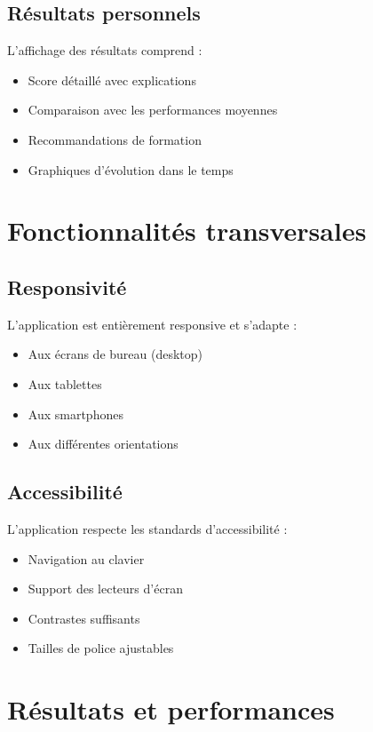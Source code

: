 \documentclass[12pt,a4paper]{report}
\begin{document}
\subsection{Résultats personnels}

L'affichage des résultats comprend :

\begin{itemize}
    \item Score détaillé avec explications
    \item Comparaison avec les performances moyennes
    \item Recommandations de formation
    \item Graphiques d'évolution dans le temps
\end{itemize}

\section{Fonctionnalités transversales}

\subsection{Responsivité}

L'application est entièrement responsive et s'adapte :

\begin{itemize}
    \item Aux écrans de bureau (desktop)
    \item Aux tablettes
    \item Aux smartphones
    \item Aux différentes orientations
\end{itemize}

\subsection{Accessibilité}

L'application respecte les standards d'accessibilité :

\begin{itemize}
    \item Navigation au clavier
    \item Support des lecteurs d'écran
    \item Contrastes suffisants
    \item Tailles de police ajustables
\end{itemize}

\section{Résultats et performances}
\end{document}

